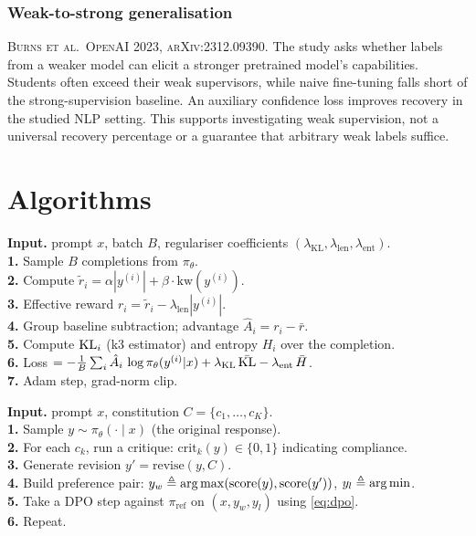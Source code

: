 \documentclass[11pt,oneside]{scrbook}
\begin{document}
\subsection*{Weak-to-strong generalisation}

\textsc{Burns et al.\ OpenAI 2023, arXiv:2312.09390.} The study
asks whether labels from a weaker model can elicit a stronger pretrained
model's capabilities. Students often exceed their weak supervisors, while
naive fine-tuning falls short of the strong-supervision baseline. An
auxiliary confidence loss improves recovery in the studied NLP setting.
This supports investigating weak supervision, not a universal recovery
percentage or a guarantee that arbitrary weak labels suffice.

\chapter{Algorithms}

\begin{tcolorbox}[colback=rlbg,colframe=rlblue,title={Algorithm: Reward-hack lab training step}]
\textbf{Input.} prompt $x$, batch $B$, regulariser coefficients
$(\lambda_\text{KL}, \lambda_\text{len}, \lambda_\text{ent})$.\\[2pt]
\textbf{1.} Sample $B$ completions from $\pi_\theta$.\\
\textbf{2.} Compute $\tilde r_i = \alpha |y^{(i)}| + \beta\cdot\text{kw}(y^{(i)})$.\\
\textbf{3.} Effective reward $r_i = \tilde r_i - \lambda_\text{len} |y^{(i)}|$.\\
\textbf{4.} Group baseline subtraction; advantage $\hat A_i = r_i - \bar r$.\\
\textbf{5.} Compute $\mathrm{KL}_i$ (k3 estimator) and entropy $H_i$ over the
completion.\\
\textbf{6.} Loss $= -\frac{1}{B}\sum_i \hat A_i \, \log \pi_\theta(y^{(i)}|x) + \lambda_\text{KL}\, \bar{\mathrm{KL}} - \lambda_\text{ent}\, \bar H$.\\
\textbf{7.} Adam step, grad-norm clip.
\end{tcolorbox}

\begin{tcolorbox}[colback=rlbg,colframe=rlblue,title={Algorithm: Constitutional AI mini-loop}]
\textbf{Input.} prompt $x$, constitution $C = \{c_1, \dots, c_K\}$.\\[2pt]
\textbf{1.} Sample $y \sim \pi_\theta(\cdot \mid x)$ (the original response).\\
\textbf{2.} For each $c_k$, run a critique:
$\text{crit}_k(y) \in \{0, 1\}$ indicating compliance.\\
\textbf{3.} Generate revision $y' = \text{revise}(y, C)$.\\
\textbf{4.} Build preference pair: $y_w \triangleq \arg\max(\text{score}(y), \text{score}(y'))$,
$y_l \triangleq \arg\min$.\\
\textbf{5.} Take a DPO step against $\pi_\text{ref}$ on $(x, y_w, y_l)$
using \eqref{eq:dpo}.\\
\textbf{6.} Repeat.
\end{tcolorbox}
\end{document}

